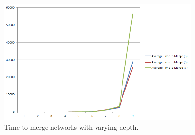 \begin{figure}[t]
\centering
\includegraphics[width=0.9\textwidth]{media/chapter5/perf/mergedepthtest.png}
\caption{Time to merge networks with varying depth.}
\label{fig:agg}
\end{figure}

